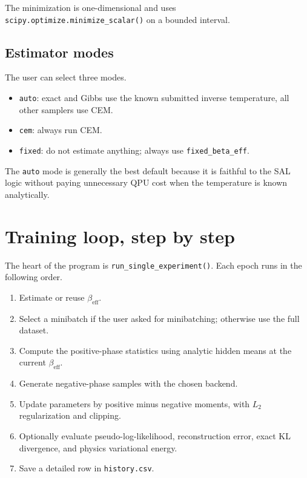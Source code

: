 \documentclass[11pt]{article}
\begin{document}
The minimization is one-dimensional and uses
\texttt{scipy.optimize.minimize\_scalar()} on a bounded interval.

\subsection{Estimator modes}

The user can select three modes.

\begin{itemize}
  \item \texttt{auto}: exact and Gibbs use the known submitted inverse
  temperature, all other samplers use CEM.
  \item \texttt{cem}: always run CEM.
  \item \texttt{fixed}: do not estimate anything; always use
  \texttt{fixed\_beta\_eff}.
\end{itemize}

The \texttt{auto} mode is generally the best default because it is faithful to
the SAL logic without paying unnecessary QPU cost when the temperature is known
analytically.

\section{Training loop, step by step}

The heart of the program is \texttt{run\_single\_experiment()}. Each epoch runs
in the following order.

\begin{enumerate}
  \item Estimate or reuse $\beta_{\mathrm{eff}}$.
  \item Select a minibatch if the user asked for minibatching; otherwise use the
  full dataset.
  \item Compute the positive-phase statistics using analytic hidden means at the
  current $\beta_{\mathrm{eff}}$.
  \item Generate negative-phase samples with the chosen backend.
  \item Update parameters by positive minus negative moments, with $L_2$
  regularization and clipping.
  \item Optionally evaluate pseudo-log-likelihood, reconstruction error, exact
  KL divergence, and physics variational energy.
  \item Save a detailed row in \texttt{history.csv}.
\end{enumerate}
\end{document}
